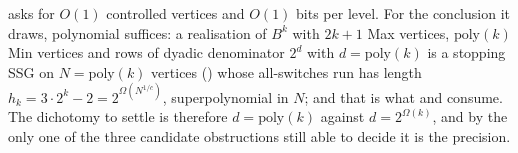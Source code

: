\begin{remark}\label{lvl:accounting}
 asks for $O(1)$ controlled vertices and $O(1)$ bits
per level.  For the conclusion it draws, polynomial suffices: a realisation of
$B^{k}$ with $2k+1$ Max vertices, $\mathrm{poly}(k)$ Min vertices and rows of
dyadic denominator $2^{d}$ with $d=\mathrm{poly}(k)$ is a stopping SSG on
$N=\mathrm{poly}(k)$ vertices () whose all-switches run
has length $h_k=3\cdot2^{k}-2=2^{\Omega(N^{1/c})}$, superpolynomial in $N$; and
that is what  and  consume.  The
dichotomy to settle is therefore $d=\mathrm{poly}(k)$ against
$d=2^{\Omega(k)}$, and by  the only one of the three
candidate obstructions still able to decide it is the precision.
\end{remark}